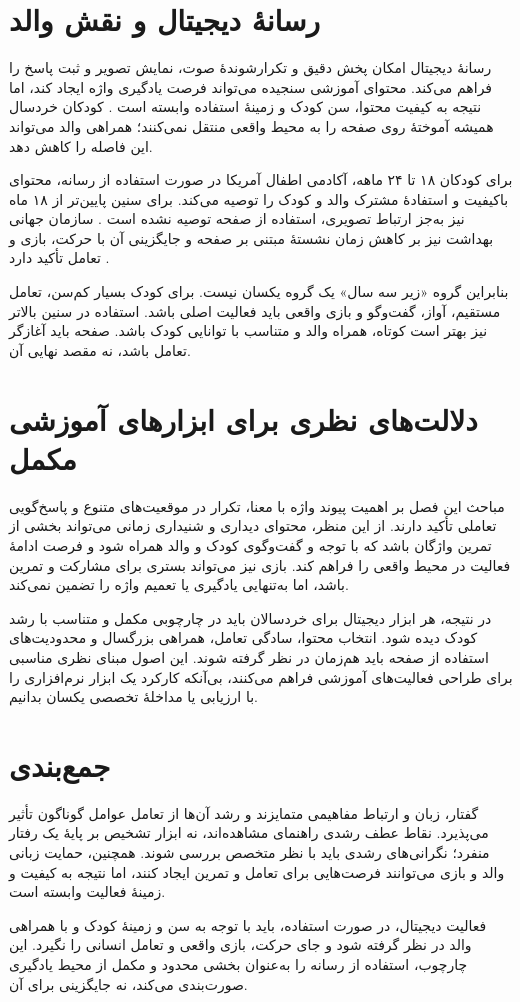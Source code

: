 \section{رسانهٔ دیجیتال و نقش والد}

رسانهٔ دیجیتال امکان پخش دقیق و تکرارشوندهٔ صوت، نمایش تصویر و ثبت پاسخ را فراهم می‌کند. محتوای آموزشی سنجیده می‌تواند فرصت یادگیری واژه ایجاد کند، اما نتیجه به کیفیت محتوا، سن کودک و زمینهٔ استفاده وابسته است \cite{Jing2023ScreenVocabulary}. کودکان خردسال همیشه آموختهٔ روی صفحه را به محیط واقعی منتقل نمی‌کنند؛ همراهی والد می‌تواند این فاصله را کاهش دهد.

برای کودکان ۱۸ تا ۲۴ ماهه، آکادمی اطفال آمریکا در صورت استفاده از رسانه، محتوای باکیفیت و استفادهٔ مشترک والد و کودک را توصیه می‌کند. برای سنین پایین‌تر از ۱۸ ماه نیز به‌جز ارتباط تصویری، استفاده از صفحه توصیه نشده است \cite{AAPMedia2016}. سازمان جهانی بهداشت نیز بر کاهش زمان نشستهٔ مبتنی بر صفحه و جایگزینی آن با حرکت، بازی و تعامل تأکید دارد \cite{WHO2019ScreenTime}.

بنابراین گروه «زیر سه سال» یک گروه یکسان نیست. برای کودک بسیار کم‌سن، تعامل مستقیم، آواز، گفت‌وگو و بازی واقعی باید فعالیت اصلی باشد. استفاده در سنین بالاتر نیز بهتر است کوتاه، همراه والد و متناسب با توانایی کودک باشد. صفحه باید آغازگر تعامل باشد، نه مقصد نهایی آن.

\section{دلالت‌های نظری برای ابزارهای آموزشی مکمل}

مباحث این فصل بر اهمیت پیوند واژه با معنا، تکرار در موقعیت‌های متنوع و پاسخ‌گویی تعاملی تأکید دارند. از این منظر، محتوای دیداری و شنیداری زمانی می‌تواند بخشی از تمرین واژگان باشد که با توجه و گفت‌وگوی کودک و والد همراه شود و فرصت ادامهٔ فعالیت در محیط واقعی را فراهم کند. بازی نیز می‌تواند بستری برای مشارکت و تمرین باشد، اما به‌تنهایی یادگیری یا تعمیم واژه را تضمین نمی‌کند.

در نتیجه، هر ابزار دیجیتال برای خردسالان باید در چارچوبی مکمل و متناسب با رشد کودک دیده شود. انتخاب محتوا، سادگی تعامل، همراهی بزرگسال و محدودیت‌های استفاده از صفحه باید هم‌زمان در نظر گرفته شوند. این اصول مبنای نظری مناسبی برای طراحی فعالیت‌های آموزشی فراهم می‌کنند، بی‌آنکه کارکرد یک ابزار نرم‌افزاری را با ارزیابی یا مداخلهٔ تخصصی یکسان بدانیم.

\section{جمع‌بندی}

گفتار، زبان و ارتباط مفاهیمی متمایزند و رشد آن‌ها از تعامل عوامل گوناگون تأثیر می‌پذیرد. نقاط عطف رشدی راهنمای مشاهده‌اند، نه ابزار تشخیص بر پایهٔ یک رفتار منفرد؛ نگرانی‌های رشدی باید با نظر متخصص بررسی شوند. همچنین، حمایت زبانی والد و بازی می‌توانند فرصت‌هایی برای تعامل و تمرین ایجاد کنند، اما نتیجه به کیفیت و زمینهٔ فعالیت وابسته است.

فعالیت دیجیتال، در صورت استفاده، باید با توجه به سن و زمینهٔ کودک و با همراهی والد در نظر گرفته شود و جای حرکت، بازی واقعی و تعامل انسانی را نگیرد. این چارچوب، استفاده از رسانه را به‌عنوان بخشی محدود و مکمل از محیط یادگیری صورت‌بندی می‌کند، نه جایگزینی برای آن.
